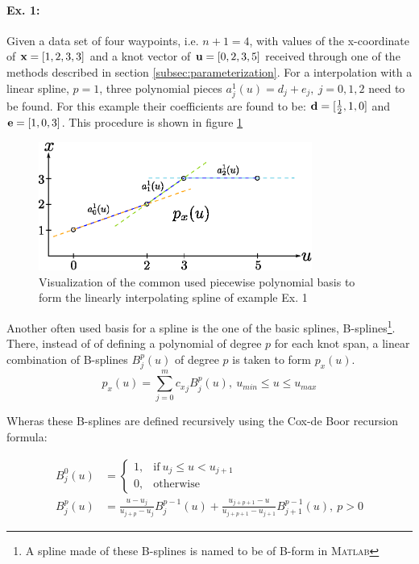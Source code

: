 \paragraph{Ex. 1:}
Given a data set of four waypoints, i.e. $n+1=4$, with values of the x-coordinate of ${\bf x} = [1,2,3,3]$ and a knot vector of ${\bf u}=[0,2,3,5]$ received through one of the methods described in section \ref{subsec:parameterization}. For a interpolation with a linear spline, $p=1$, three polynomial pieces $a_j^1(u)=d_j+e_j,~j=0,1,2$ need to be found. For this example their coefficients are found to be: ${\bf d}=[\frac{1}{2},1,0]$ and ${\bf e}=[1,0,3]$. This procedure is shown in figure \ref{fig:ppSpline}

\begin{figure}[H]
	\centering
    \includegraphics[width = 0.8\textwidth]{graphics/ppSpline.eps}
  \caption{Visualization of the common used piecewise polynomial basis to form the linearly interpolating spline of example Ex. 1}
  \label{fig:ppSpline}
\end{figure} 


Another often used basis for a spline is the one of the basic splines, B-splines\footnote{A spline made of these B-splines is named to be of B-form in \textsc{Matlab}}. There, instead of of defining a polynomial of degree $p$ for each knot span, a linear combination of B-splines $B_j^p(u)$ of degree $p$ is taken to form $p_x(u)$.
\begin{equation}
p_x(u) = \sum_{j=0}^m {c_x}_jB_j^p(u), ~u_{min} \leq u \leq u_{max}
\end{equation}

 Wheras these B-splines are defined recursively using the Cox-de Boor recursion formula:
 
 \begin{align}
B_j^0(u) &= \begin{cases} 1,&\text{if}~ u_j \leq u < u_{j+1}\\
					0,&\text{otherwise}
		\end{cases}\\
B_j^p(u) &= \frac{u-u_j}{u_{j+p}-u_j}B_j^{p-1}(u)+\frac{u_{j+p+1}-u}{u_{j+p+1}-u_{j+1}}B_{j+1}^{p-1}(u), ~p>0
\end{align}

